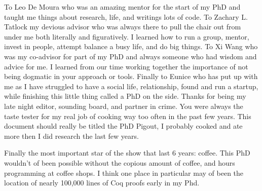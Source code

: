 To Leo De Moura who was an amazing mentor for the start of
    my PhD and taught me things about research, life, and writings lots of code.
To Zachary L. Tatlock my devious advisor who was always there
    to pull the chair out from under me both literally and figuratively.
I learned how to run a group, mentor, invest in people, attempt
    balance a busy life, and do big things.
To Xi Wang who was my co-advisor for part of my PhD
    and always someone who had wisdom and advice for me.
I learned from our time working together the importance of
    not being dogmatic in your approach or tools.
Finally to Eunice who has put up with me as I have struggled
    to have a social life, relationship, found and run a startup,
    while finishing this little thing called a PhD on the side.
Thanks for being my late night editor, sounding board, and
    partner in crime.
You were always the taste tester for my real job
    of cooking way too often in the past few years.
This document should really be titled the PhD Pigout, I probably cooked
    and ate more then I did research the last few years.

Finally the most important star of the show that last 6 years: coffee.
This PhD wouldn't of been possible without the copious amount of coffee,
    and hours programming at coffee shops.
I think one place in particular may of been the location of nearly 100,000
    lines of Coq proofs early in my Phd.
